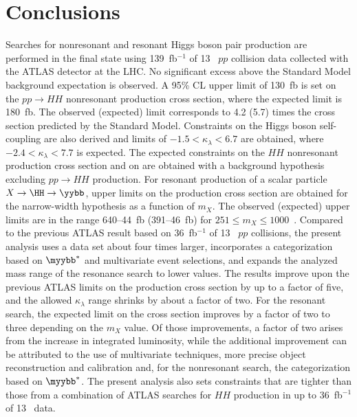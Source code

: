 \documentclass[PAPER, cernpreprint, texlive=2016, paper=a4, USenglish, texmf]{atlasdoc}
\begin{document}
\section{Conclusions}
Searches for nonresonant and resonant Higgs boson pair production are performed in the \yybb{} final state using 139~fb$^{-1}$ of 13~\TeV{} $pp$ collision data collected with the ATLAS detector at the LHC. No significant excess above the Standard Model background expectation is observed. A 95\% CL upper limit of 130~fb is set on the $pp \rightarrow HH$ nonresonant production cross section, where the expected limit is 180~fb. The observed (expected) limit corresponds to 4.2 (5.7) times the cross section predicted by the Standard Model. Constraints on the Higgs boson self-coupling are also derived and limits of $-1.5< \kappa_{\lambda}<6.7$ are obtained, where  $-2.4< \kappa_{\lambda}<7.7$ is expected. The  expected constraints on the $HH$ nonresonant production cross section and on \klambda are obtained with a background hypothesis excluding $pp \rightarrow HH$ production.
For resonant production of a scalar particle $X\to\HH\to\yybb$, upper limits on the production cross section are obtained for the narrow-width hypothesis as a function of $m_{X}$. The observed (expected) upper limits are in the range  640--44~fb (391--46~fb) for $251 \leq m_{X} \leq 1000$~\GeV. Compared to the previous ATLAS result based on 36~fb$^{-1}$ of 13~\TeV{} $pp$ collisions, the present analysis uses a data set about four times larger, incorporates a categorization based on $\myybb^{*}$ and multivariate event selections, and expands the analyzed mass range of the resonance search to lower values. The results improve upon the previous ATLAS limits on the \hhyybb{} production cross section by up to a factor of five, and the allowed $\kappa_{\lambda}$ range shrinks by about a factor of two. 
For the resonant search, the expected limit on the cross section improves by a factor of two to three depending on the $m_X$ value. Of those improvements,  a factor of two arises from the increase in integrated luminosity, while the additional improvement can be attributed to the use of multivariate techniques, more precise object reconstruction and calibration and, for the nonresonant search, the categorization based on $\myybb^{*}$. The present analysis also sets constraints that are tighter than those from a combination of ATLAS searches for $HH$ production in up to 36~fb$^{-1}$ of 13~\TeV{} data.
 
 
 
\end{document}

